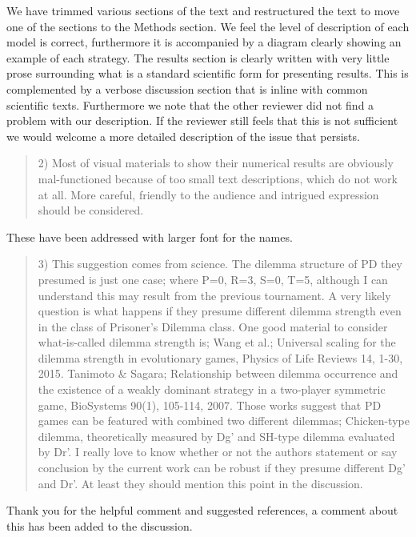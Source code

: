 \documentclass[a4]{article}
\begin{document}
We have trimmed various sections of the text and restructured the text to move
one of the sections to the Methods section. We feel the level of description of
each model is correct, furthermore it is accompanied by a diagram clearly
showing an example of each strategy. The results section is clearly written with
very little prose surrounding what is a standard scientific form for presenting
results. This is complemented by a verbose discussion section that is inline
with common scientific texts. Furthermore we note that the other reviewer did
not find a problem with our description. If the reviewer still feels that this
is not sufficient we would welcome a more detailed description of the issue that
persists.

\begin{quote}
2) Most of visual materials to show their numerical results are obviously mal-functioned because of too small text descriptions, which do not work at all. More careful, friendly to the audience and intrigued expression should be considered.
\end{quote}

These have been addressed with larger font for the names.

\begin{quote}
3) This suggestion comes from science. The dilemma structure of PD they presumed is just one case; where P=0, R=3, S=0, T=5, although I can understand this may result from the previous tournament. A very likely question is what happens if they presume different dilemma strength even in the class of Prisoner’s Dilemma class. One good material to consider what-is-called dilemma strength is;
Wang et al.; Universal scaling for the dilemma strength in evolutionary games, Physics of Life Reviews 14, 1-30, 2015.
Tanimoto \& Sagara; Relationship between dilemma occurrence and the existence of a weakly dominant strategy in a two-player symmetric game, BioSystems 90(1), 105-114, 2007.
Those works suggest that PD games can be featured with combined two different dilemmas; Chicken-type dilemma, theoretically measured by Dg’ and SH-type dilemma evaluated by Dr’. I really love to know whether or not the authors statement or say conclusion by the current work can be robust if they presume different Dg’ and Dr’. At least they should mention this point in the discussion.
\end{quote}

Thank you for the helpful comment and suggested references, a comment about this
has been added to the discussion.
\end{document}
